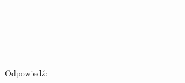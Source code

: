 \documentclass[10pt]{article}
\begin{document}
\begin{center}
\begin{tabular}{|c|c|c|c|c|c|c|c|c|c|c|c|c|c|c|c|c|c|c|c|c|}
 &  &  &  &  &  &  &  &  &  &  &  &  &  &  &  &  &  &  &  &  \\
\hline
 &  &  &  &  &  &  &  &  &  &  &  &  &  &  &  &  &  &  &  &  \\
\hline
 &  &  &  &  &  &  &  &  &  &  &  &  &  &  &  &  &  &  &  &  \\
\hline
 &  &  &  &  &  &  &  &  &  &  &  &  &  &  &  &  &  &  &  &  \\
\hline
 &  &  &  &  &  &  &  &  &  &  &  &  &  &  &  &  &  &  &  &  \\
\hline
 &  &  &  &  &  &  &  &  &  &  &  &  &  &  &  &  &  &  &  &  \\
\hline
 &  &  &  &  &  &  &  &  &  &  &  &  &  &  &  &  &  &  &  &  \\
\hline
 &  &  &  &  &  &  &  &  &  &  &  &  &  &  &  &  &  &  &  &  \\
\hline
 &  &  &  &  &  &  &  &  &  &  &  &  &  &  &  &  &  &  &  &  \\
\hline
 &  &  &  &  &  &  &  &  &  &  &  &  &  &  &  &  &  &  &  &  \\
\hline
 &  &  &  &  &  &  &  &  &  &  &  &  &  &  &  &  &  &  &  &  \\
\hline
 &  &  &  &  &  &  &  &  &  &  &  &  &  &  &  &  &  &  &  &  \\
\hline
 &  &  &  &  &  &  &  &  &  &  &  &  &  &  &  &  &  &  &  &  \\
\hline
 &  &  &  &  &  &  &  &  &  &  &  &  &  &  &  &  &  &  &  &  \\
\hline
 &  &  &  &  &  &  &  &  &  &  &  &  &  &  &  &  &  &  &  &  \\
\hline
 &  &  &  &  &  &  &  &  &  &  &  &  &  &  &  &  &  &  &  &  \\
\hline
 &  &  &  &  &  &  &  &  &  &  &  &  &  &  &  &  &  &  &  &  \\
\hline
 &  &  &  &  &  &  &  &  &  &  &  &  &  &  &  &  &  &  &  &  \\
\hline
\end{tabular}
\end{center}

Odpowiedź:
\end{document}
